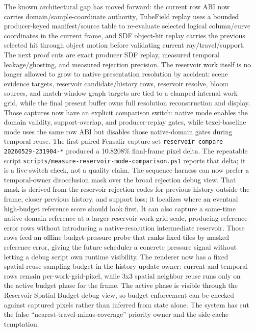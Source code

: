 \documentclass[11pt]{article}
\begin{document}
The known architectural gap has moved forward: the current row ABI now carries
domain/sample-coordinate authority, TubeField replay uses a bounded
producer-keyed manifest/source table to re-evaluate selected logical
column/curve coordinates in the current frame, and SDF object-hit replay carries
the previous selected hit through object motion before validating current
ray/travel/support.  The next proof cuts are exact producer SDF replay, measured
temporal leakage/ghosting, and measured rejection precision.
The reservoir work itself is no longer allowed to grow to native presentation
resolution by accident: scene evidence targets, reservoir candidate/history
rows, reservoir resolve, bloom sources, and match-window graph targets are tied
to a clamped internal work grid, while the final present buffer owns full
resolution reconstruction and display.
Those captures now have an explicit comparison switch: native mode enables the
domain validity, support-overlap, and producer-replay gates, while texel-baseline
mode uses the same row ABI but disables those native-domain gates during
temporal reuse.  The first paired Fensalir capture set
\texttt{reservoir-compare-20260529-231904-*} produced a 10.8208\% final-frame
pixel delta.  The repeatable script
\texttt{scripts/measure-reservoir-mode-comparison.ps1} reports that delta; it
is a live-switch check, not a quality claim.
The sequence harness can now prefer a temporal-owner disocclusion mask over the
broad rejection debug view.  That mask is derived from the reservoir rejection
codes for previous history outside the frame, closer previous history, and
support loss; it localizes where an eventual high-budget reference score should
look first.  It can also capture a same-time native-domain reference at a larger
reservoir work-grid scale, producing reference-error rows without introducing a
native-resolution intermediate reservoir.
Those rows feed an offline budget-pressure probe that ranks fixed tiles by
masked reference error, giving the future scheduler a concrete pressure signal
without letting a debug script own runtime visibility.
The renderer now has a fixed spatial-reuse sampling budget in the history update
owner: current and temporal rows remain per-work-grid-pixel, while 3x3 spatial
neighbor reuse runs only on the active budget phase for the frame.
The active phase is visible through the Reservoir Spatial Budget debug view, so
budget enforcement can be checked against captured pixels rather than inferred
from state alone.
The system has cut the false ``nearest-travel-minus-coverage'' priority owner
and the side-cache temptation.
\end{document}
